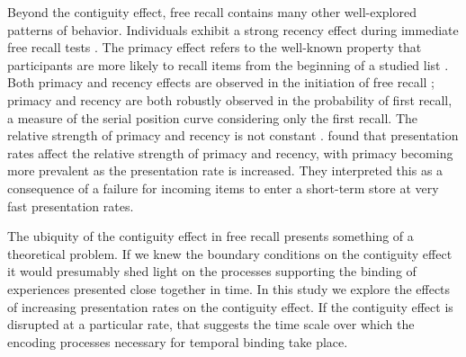 \documentclass[10pt,letterpaper]{article}
\begin{document}
Beyond the contiguity effect, free recall contains many other well-explored
patterns of behavior. Individuals exhibit a strong recency effect during
immediate free recall tests \cite{GlanCuni66}. The primacy effect refers to
the well-known property that participants are more likely to recall items from
the beginning of a studied list \cite{Murd62}.   Both primacy and recency
effects are observed in the initiation of free recall \cite{Hoga75,Lami99};
primacy and recency are both robustly observed in the probability of first
recall,  a measure of the serial position curve considering only the first
recall.  The relative strength of primacy and recency  is not constant
\cite{Murd62}.   found that presentation rates affect the
relative strength of primacy and recency, with primacy becoming more prevalent
as the presentation rate is increased.  They interpreted this as a consequence
of a failure for incoming items to enter a short-term store at very fast
presentation rates.


\nocite{DaveEtal05}
The ubiquity of the contiguity effect  in free recall presents something of a
theoretical problem.  If we knew the boundary conditions on the contiguity
effect it would presumably shed light on the processes supporting the binding
of experiences presented close together in time.  In this study we explore the
effects of increasing presentation rates on the contiguity effect.  If the
contiguity effect is disrupted at a particular rate, that suggests the time
scale over which the encoding processes necessary for temporal binding take
place.
\end{document}
